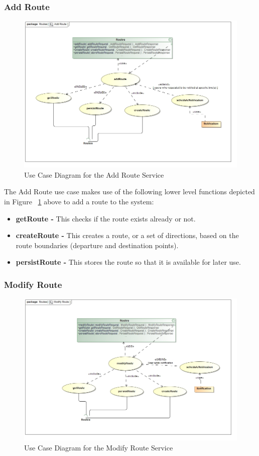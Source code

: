 \documentclass[a4paper,12pt]{article}
\begin{document}
\subsubsection{Add Route}
\begin{figure}[here]
\includegraphics[width=\textwidth]{images/Add_Route.jpg}
\caption{Use Case Diagram for the Add Route Service}
\label{fig:uc_add}
\end{figure}

The Add Route use case makes use of the following lower level functions depicted in Figure ~\ref{fig:uc_add} above to add a route to the system:
\begin{itemize}
\item \textbf{getRoute -} This checks if the route exists already or not.
\item \textbf{createRoute -} This creates a route, or a set of directions, based on the route boundaries (departure and destination points).
\item \textbf{persistRoute -} This stores the route so that it is available for later use.
\end{itemize}

\subsubsection{Modify Route} 
\begin{figure}[here]
\includegraphics[width=\textwidth]{images/Modify_Route.jpg}
\caption{Use Case Diagram for the Modify Route Service}
\label{fig:uc_modify}
\end{figure}
\end{document}
